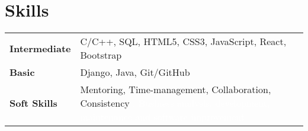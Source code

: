 \documentclass[a4,10pt]{article}
\newenvironment{zitemize}{
\begin{itemize}\itemsep0pt \parskip0pt \parsep1pt}
{\end{itemize}\vspace{-0.5cm}}
\newcommand{\hskills}[1]{
\textbf{\bfseries #1} }
\begin{document}
\section{Skills}
\begin{tabular}{p{7em} p{48em}}
\hskills{Intermediate} &  C/C++, SQL, HTML5, CSS3, JavaScript, React, Bootstrap \\
\hskills{Basic} & Django, Java, Git/GitHub  \\
\hskills{Soft Skills} & Mentoring, Time-management, Collaboration, Consistency 
\textcolor{WHITE}{, Business analysis, development, maintenance and
software improvement}
\end{tabular}
\vspace{-0.2cm}






\end{document}
